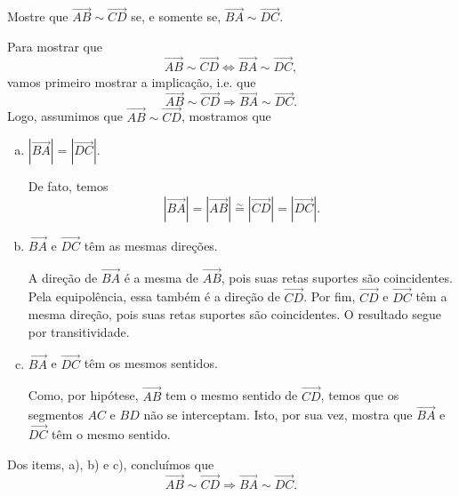 \begin{exeresol}
  Mostre que $\overrightarrow{AB}\sim \overrightarrow{CD}$ se, e somente se, $\overrightarrow{BA}\sim \overrightarrow{DC}$.
\end{exeresol}
\begin{resol}
  Para mostrar que
  \begin{equation}
    \overrightarrow{AB}\sim \overrightarrow{CD} \Leftrightarrow \overrightarrow{BA}\sim \overrightarrow{DC},
  \end{equation}
  vamos primeiro mostrar a implicação, i.e. que
  \begin{equation}
    \overrightarrow{AB}\sim \overrightarrow{CD} \Rightarrow \overrightarrow{BA}\sim \overrightarrow{DC}.
  \end{equation}
  Logo, assumimos que $\overrightarrow{AB}\sim \overrightarrow{CD}$, mostramos que
  \begin{enumerate}[a)]
    \item $\left|\overrightarrow{BA}\right| = \left|\overrightarrow{DC}\right|$.
    
      De fato, temos
      \begin{equation}
        \left|\overrightarrow{BA}\right| = \left|\overrightarrow{AB}\right| \overset{\sim}{=} \left|\overrightarrow{CD}\right| = \left|\overrightarrow{DC}\right|.
      \end{equation}

    \item $\overrightarrow{BA}$ e $\overrightarrow{DC}$ têm as mesmas direções.
    
      A direção de $\overrightarrow{BA}$ é a mesma de $\overrightarrow{AB}$, pois suas retas suportes são coincidentes. Pela equipolência, essa também é a direção de $\overrightarrow{CD}$. Por fim,  $\overrightarrow{CD}$ e $\overrightarrow{DC}$ têm a mesma direção, pois suas retas suportes são coincidentes. O resultado segue por transitividade.
      
    \item $\overrightarrow{BA}$ e $\overrightarrow{DC}$ têm os mesmos sentidos.
    
      Como, por hipótese, $\overrightarrow{AB}$ tem o mesmo sentido de $\overrightarrow{CD}$, temos que os segmentos $AC$ e $BD$ não se interceptam. Isto, por sua vez, mostra que $\overrightarrow{BA}$ e $\overrightarrow{DC}$ têm o mesmo sentido.
  \end{enumerate}

  Dos items, a), b) e c), concluímos que
  \begin{equation}
    \overrightarrow{AB}\sim \overrightarrow{CD} \Rightarrow \overrightarrow{BA}\sim \overrightarrow{DC}.
  \end{equation}


\end{resol}
